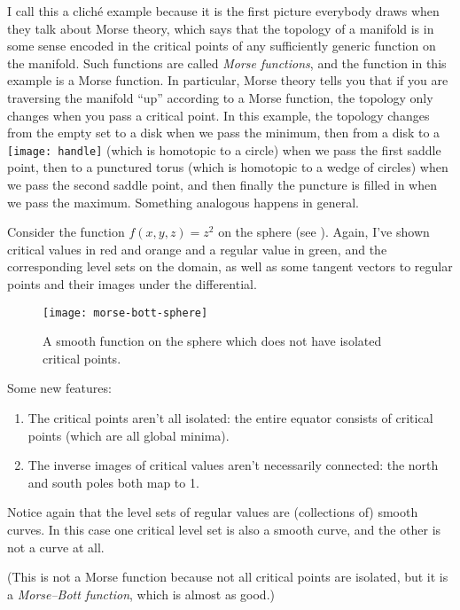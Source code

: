 \begin{remark}
	I call this a cliché example because it is the first picture everybody draws when they talk about Morse theory, which says that the topology of a manifold is in some sense encoded in the critical points of any sufficiently generic function on the manifold. Such functions are called \emph{Morse functions}, and the function in this example is a Morse function. In particular, Morse theory tells you that if you are traversing the manifold ``up'' according to a Morse function, the topology only changes when you pass a critical point. In this example, the topology changes from the empty set to a disk when we pass the minimum, then from a disk to a \texttt{[image: handle]} (which is homotopic to a circle) when we pass the first saddle point, then to a punctured torus (which is homotopic to a wedge of circles) when we pass the second saddle point, and then finally the puncture is filled in when we pass the maximum. Something analogous happens in general.
\end{remark}

\begin{example}
	Consider the function $f(x,y,z) = z^2$ on the sphere (see ). Again, I've shown critical values in red and orange and a regular value in green, and the corresponding level sets on the domain, as well as some tangent vectors to regular points and their images under the differential.
	
		\begin{figure}[htbp]
			\centering
				\texttt{[image: morse-bott-sphere]}
			\caption{A smooth function on the sphere which does not have isolated critical points.}
			\label{fig:sphere}
		\end{figure}
	
	Some new features:
	\begin{enumerate}
		\item The critical points aren't all isolated: the entire equator consists of critical points (which are all global minima).
		
		\item The inverse images of critical values aren't necessarily connected: the north and south poles both map to 1.
	\end{enumerate}
	
	Notice again that the level sets of regular values are (collections of) smooth curves. In this case one critical level set is also a smooth curve, and the other is not a curve at all.
	
	(This is not a Morse function because not all critical points are isolated, but it is a \emph{Morse–Bott function}, which is almost as good.)
	\end{example}
	

